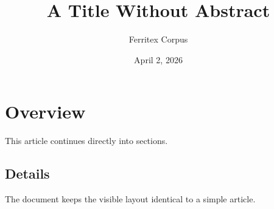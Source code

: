 \documentclass{article}
\title{A Title Without Abstract}
\author{Ferritex Corpus}
\date{April 2, 2026}
\def\maketitle{}
\begin{document}
\maketitle

\section{Overview}
This article continues directly into sections.

\subsection{Details}
The document keeps the visible layout identical to a simple article.
\end{document}

